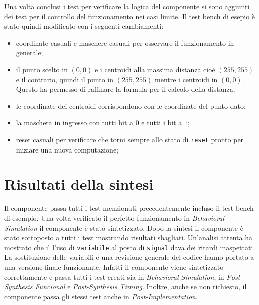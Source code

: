 \documentclass{article}
\begin{document}
Una volta conclusi i test per verificare la logica del componente si sono aggiunti dei test per il controllo del funzionamento nei casi limite. Il test bench di esepio \`{e} stato quindi modificato con i seguenti cambiamenti:
\begin{itemize}
	\item coordinate casuali e maschere casuali per osservare il funzionamento in generale;
	\item il punto scelto in $(0,0)$ e i centroidi alla massima distanza cio\`{e} $(255,255)$ e il contrario, quindi il punto in $(255,255)$ mentre i centroidi in $(0,0)$. Questo ha permesso di raffinare la formula per il calcolo della distanza.
	\item le coordinate dei centroidi corrispondono con le coordinate del punto dato;
	\item la maschera in ingresso con tutti bit a $0$ e tutti i bit a $1$;
	\item reset casuali per verificare che torni sempre allo stato di \texttt{reset} pronto per iniziare una nuova computazione;	
\end{itemize}




\section{Risultati della sintesi}
Il componente passa tutti i test menzionati precedentemente incluso il test bench di esempio. Una volta verificato il perfetto funzionamento in \textit{Behavioral Simulation} il componente \`{e} stato sintetizzato. Dopo la sintesi il componente \`{e} stato sottoposto a tutti i test mostrando risultati sbagliati. Un'analisi attenta ha mostrato che il l'uso di \texttt{variabile} al posto di \texttt{signal} dava dei ritardi inaspettati. La sostituzione delle variabili e una revisione generale del codice hanno portato a una versione finale funzionante. Infatti il componente viene sintetizzato correttamente e passa tutti i test creati sia in \textit{Behavioral Simulation}, in \textit{Post-Synthesis Funcional} e \textit{Post-Synthesis Timing}. Inoltre, anche se non richiesto, il componente passa gli stessi test anche in \textit{Post-Implementation}.

\pagebreak


 
\pagebreak
\end{document}
